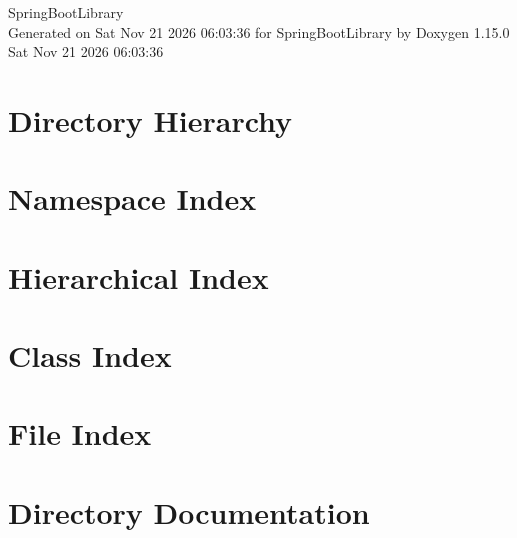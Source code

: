 \documentclass[twoside]{book}
\newcommand{\+}{\discretionary{\mbox{\scriptsize$\hookleftarrow$}}{}{}}
\newcommand{\clearemptydoublepage}{%
    \newpage{\pagestyle{empty}\cleardoublepage}%
  }
\begin{document}
  \raggedbottom
    \hypersetup{pageanchor=false,
                bookmarksnumbered=true,
                pdfencoding=unicode
               }
  \begin{titlepage}
  \vspace*{7cm}
  \begin{center}%
  {\Large Spring\+Boot\+Library}\\
  \vspace*{1cm}
  {\large Generated on Sat Nov 21 2026 06\+:03\+:36 for Spring\+Boot\+Library by Doxygen 1.15.0}\\
    \vspace*{0.5cm}
    {\small Sat Nov 21 2026 06:03:36}
  \end{center}
  \end{titlepage}
  \clearemptydoublepage
  \tableofcontents
  \clearemptydoublepage
  \hypersetup{pageanchor=true}
\chapter{Directory Hierarchy}

\chapter{Namespace Index}

\chapter{Hierarchical Index}

\chapter{Class Index}

\chapter{File Index}

\chapter{Directory Documentation}



















\end{document}

